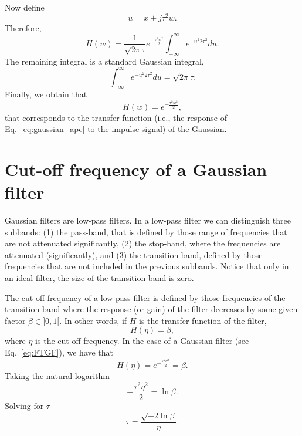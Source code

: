 \begin{subappendices}
\begin{equation*}
\end{equation*}
Now define
\begin{equation*}
  u = x + j\tau^2w.
\end{equation*}
Therefore,
\begin{equation*}
  H(w) = \frac{1}{\sqrt{2\pi}\tau}e^{-\frac{\tau^2w^2}{2}}\int_{-\infty}^{\infty}e^{{-u^2}{2\tau^2}}du.
\end{equation*}
The remaining integral is a standard Gaussian integral,
\begin{equation*}
  \int_{-\infty}^{\infty}e^{{-u^2}{2\tau^2}}du = \sqrt{2\pi}\tau.
\end{equation*}
Finally, we obtain that
\begin{equation}
  H(w) = e^{-\frac{\tau^2w^2}{2}},
  \label{eq:FTGF}
\end{equation}
that corresponds to the transfer function (i.e., the response of
Eq.~\ref{eq:gaussian_ape} to the impulse signal) of the Gaussian.


\section{Cut-off frequency of a Gaussian filter}
\label{sec:tau_VS_eta}

Gaussian filters are low-pass filters. In a low-pass filter we can
distinguish three subbands: (1) the pass-band, that is defined by
those range of frequencies that are not attenuated significantly, (2)
the stop-band, where the frequencies are attenuated (significantly),
and (3) the transition-band, defined by those frequencies that are not
included in the previous subbands. Notice that only in an ideal
filter, the size of the transition-band is zero.

The cut-off frequency of a low-pass filter is defined by those
frequencies of the transition-band where the response (or gain) of the
filter decreases by some given factor $\beta\in]0,1[$. In other words,
if $H$ is the transfer function of the filter,
\begin{equation}
  H(\eta) = \beta,
\end{equation}
where $\eta$ is the cut-off frequency. In the case of a Gaussian
filter (see Eq.~\ref{eq:FTGF}), we have that
\begin{equation*}
  H(\eta) = e^{-\frac{\tau^2\eta^2}{2}} = \beta.
\end{equation*}
Taking the natural logarithm
\begin{equation*}
  -\frac{\tau^2\eta^2}{2} = \ln\beta.
\end{equation*}
Solving for $\tau$
\begin{equation}
  \tau = \frac{\sqrt{-2\ln\beta}}{\eta}.
  \label{eq:tau_VS_eta}
\end{equation}


\end{subappendices}
